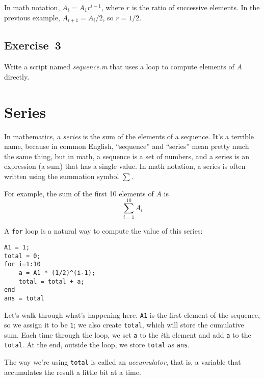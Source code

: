 In math notation, $A_i = A_1 r^{i-1}$, where $r$ is the ratio of successive elements.
In the previous example, $A_{i+1} = A_i/2$, so $r = 1/2$.

\subsection{Exercise~3}
Write a script named \emph{sequence.m} that uses a loop to 
compute elements of $A$ \mbox{directly}.


\section{Series}
\label{series}

In mathematics, a \emph{series} is the sum of the elements of
a sequence.  It's a terrible name, because in common English,
``sequence'' and ``series'' mean pretty much the same thing, but in
math, a sequence is a set of numbers, and a series is an expression
(a sum) that has a single value.  In math notation, \linebreak a series
is often written using the summation symbol $\sum$.


For example, the sum of the first 10 elements of $A$ is
\begin{equation*}
\sum_{i=1}^{10} A_i
\end{equation*}

A \lstinline{for} loop is a natural way to compute the value of this series:

\begin{lstlisting}[caption={A program that calculates a simple series}, label={lst:series_10}]
A1 = 1;
total = 0;
for i=1:10
    a = A1 * (1/2)^(i-1);
    total = total + a;
end
ans = total
\end{lstlisting}

Let's walk through what's happening here. \lstinline{A1} is the first element of the sequence, so we assign it to be \lstinline{1}; we also create \lstinline{total}, which will store the cumulative sum.
Each time through the loop, we set \lstinline{a} to the $i$th element and add \lstinline{a} to the \lstinline{total}.
At the end, outside the loop, we store \linebreak \lstinline{total} as \lstinline{ans}.

The way we're using \lstinline{total} is called an \emph{accumulator}, that is, a variable that accumulates the result a little bit at a time.  



